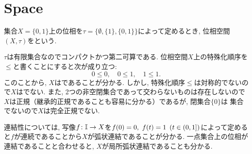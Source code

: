 \documentclass[uplatex, dvipdfmx, a4paper, 12pt, class=jsbook, crop=false]{standalone}
\begin{document}
\section{\Sierpinski Space}
\label{ex:Sierpinski-space}

集合$ X = \{0, 1\}$上の位相を$ \tau = \{\emptyset, \{1\}, \{0, 1\}\} $によって定めるとき, 位相空間$ (X, \tau) $をという.

$ \tau $は有限集合なのでコンパクトかつ第二可算である. 位相空間$ X $上の特殊化順序を$ \leq $と書くことにすると次が成り立つ:
$$ 0 \leq 0,\quad  0 \leq 1,\quad 1 \leq 1. $$
このことから, $ X $はであることが分かる. しかし, 特殊化順序$ \leq $は対称的でないので$ X $はでない.
また, 2つの非空閉集合であって交わらないものは存在しないので$ X $は正規（継承的正規であることも容易に分かる）であるが, 閉集合$ \{0\} $は \Gdelta 集合でないので$ X $は完全正規でない.

連結性については, 写像$ f \colon \mathbb{I} \to X $を$ f(0) = 0, \ f(t) = 1 \ \left(t \in \left( 0 , 1 \right]\right) $によって定めると$ f $が連続であることから$ X $が弧状連結であることが分かる. 一点集合上の位相が連結であることと合わせると, $ X $が局所弧状連結であることも分かる.
\end{document}
